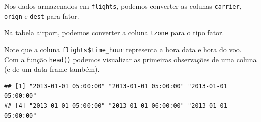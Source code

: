 \documentclass[
]{book}
\newenvironment{Shaded}{\begin{snugshade}}{\end{snugshade}}
\newcommand{\FunctionTok}[1]{\textcolor[rgb]{0.13,0.29,0.53}{\textbf{#1}}}
\newcommand{\NormalTok}[1]{#1}
\newcommand{\OtherTok}[1]{\textcolor[rgb]{0.56,0.35,0.01}{#1}}
\newcommand{\SpecialCharTok}[1]{\textcolor[rgb]{0.81,0.36,0.00}{\textbf{#1}}}
\begin{document}
Nos dados armazenados em \texttt{flights}, podemos converter as colunas \texttt{carrier}, \texttt{orign} e \texttt{dest} para fator.

\begin{Shaded}
\end{Shaded}

Na tabela airport, podemos converter a coluna \texttt{tzone} para o tipo fator.

\begin{Shaded}
\end{Shaded}

Note que a coluna \texttt{flights\$time\_hour} representa a hora data e hora do voo.
Com a função \texttt{head()} podemos visualizar as primeiras observações de uma coluna (e de um data frame também).

\begin{Shaded}
\end{Shaded}

\begin{verbatim}
## [1] "2013-01-01 05:00:00" "2013-01-01 05:00:00" "2013-01-01 05:00:00"
## [4] "2013-01-01 05:00:00" "2013-01-01 06:00:00" "2013-01-01 05:00:00"
\end{verbatim}

\begin{Shaded}
\end{Shaded}
\end{document}
